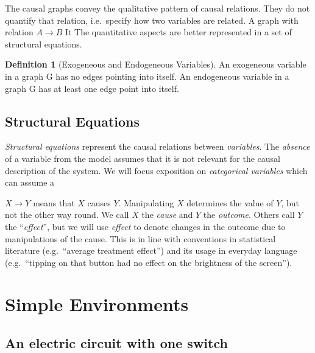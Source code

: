 \documentclass[
]{book}
\theoremstyle{definition}
\newtheorem{definition}{Definition}[chapter]
\theoremstyle{definition}
\theoremstyle{definition}
\theoremstyle{remark}
\begin{document}
The causal graphs convey the qualitative pattern of causal relations. They do not quantify that relation, i.e.~specify how two variables are related. A graph with relation \(A \rightarrow B\)
It The quantitative aspects are better represented in a set of structural equations.

\begin{definition}[Exogeneous and Endogeneous Variables]
\protect\hypertarget{def:exoendo}{}{\label{def:exoendo} {} }An exogeneous variable in a graph G has no edges pointing into itself.
An endogeneous variable in a graph G has at least one edge point into itself.
\end{definition}

\hypertarget{structural-equations}{%
\subsection{Structural Equations}\label{structural-equations}}

\emph{Structural equations} represent the causal relations between \emph{variables}. The \emph{absence} of a variable from the model assumes that it is not relevant for the causal description of the system.
We will focus exposition on \emph{categorical variables} which can assume a

\(X \rightarrow Y\) means that \(X\) causes \(Y\). Manipulating \(X\) determines the value of \(Y\), but not the other way round. We call \(X\) the \emph{cause} and \(Y\) the \emph{outcome}. Others call \(Y\) the ``\emph{effect}'', but we will use \emph{effect} to denote changes in the outcome due to manipulations of the cause. This is in line with conventions in statistical literature (e.g.~``average treatment effect'') and its usage in everyday language (e.g.~``tipping on that button had no effect on the brightness of the screen'').

\hypertarget{simple-environments}{%
\section{Simple Environments}\label{simple-environments}}

\hypertarget{an-electric-circuit-with-one-switch}{%
\subsection{An electric circuit with one switch}\label{an-electric-circuit-with-one-switch}}
\end{document}
